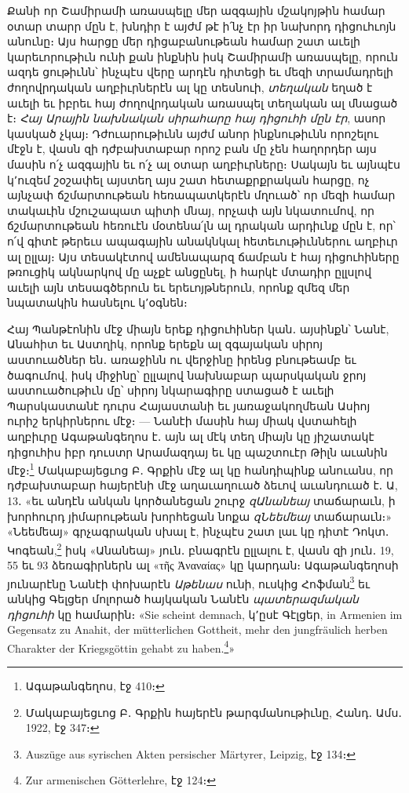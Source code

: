 \documentclass{article}
\begin{document}
{Քանի որ Շամիրամի առասպելը մեր ազգային մշակոյթին համար օտար տարր մըն է, խնդիր է այժմ թէ ի՛նչ էր իր նախորդ դիցուհւոյն անունը։ Այս հարցը մեր դիցաբանութեան համար շատ աւելի կարեւորութիւն ունի քան ինքնին իսկ Շամիրամի առասպելը, որուն ազդե ցութիւնն՝ ինչպէս վերը արդէն դիտեցի եւ մեզի տրամադրելի ժողովրդական աղբիւրներէն ալ կը տեսնուի, \emph{տեղական} եղած է աւելի եւ իբրեւ հայ ժողովրդական առասպել տեղական ալ մնացած է։ \emph{Հայ Արային նախնական սիրահարը հայ դիցուհի մըն էր}, ասոր կասկած չկայ։ Դժուարութիւնն այժմ անոր ինքնութիւնն որոշելու մէջն է, վասն զի դժբախտաբար որոշ բան մը չեն հաղորդեր այս մասին ո՛չ ազգային եւ ո՛չ ալ օտար աղբիւրները։ Սակայն եւ այնպէս կ՚ուզեմ շօշափել այստեղ այս շատ հետաքրքրական հարցը, ոչ այնչափ ճշմարտութեան հեռապատկերէն մղուած՝ որ մեզի համար տակաւին մշուշապատ պիտի մնայ, որչափ այն նկատումով, որ ճշմարտութեան հեռուէն մօտենա՛լն ալ դրական արդիւնք մըն է, որ՝ ո՛վ գիտէ թերեւս ապագային անակնկալ հետեւութիւններու աղբիւր ալ ըլլայ։ Այս տեսակէտով ամենապարզ ճամբան է հայ դիցուհիները թռուցիկ ակնարկով մը աչքէ անցընել, ի հարկէ մտադիր ըլլսլով աւելի այն տեսագծերուն եւ երեւոյթներուն, որոնք զմեզ մեր նպատակին հասնելու կ՚օգնեն։

Հայ Պանթէոնին մէջ միայն երեք դիցուհիներ կան․ այսինքն՝ Նանէ, Անահիտ եւ Աստղիկ, որոնք երեքն ալ զգայական սիրոյ աստուածներ են․ առաջինն ու վերջինը իրենց բնութեամբ եւ ծագումով, իսկ միջինը՝ ըլլալով նախնաբար պարսկական ջրոյ աստուածութիւն մը՝ սիրոյ նկարագիրը ստացած է աւելի Պարսկաստանէ դուրս Հայաստանի եւ յառաջակողմեան Ասիոյ ուրիշ երկիրներու մէջ։ — Նանէի մասին հայ միակ վստահելի աղբիւրը Ագաթանգեղոս է․ այն ալ մէկ տեղ միայն կը յիշատակէ դիցուհիս իբր դուստր Արամազդայ եւ կը պաշտուէր Թիլն աւանին մէջ։\footnote{Ագաթանգեղոս, էջ 410։} Մակաբայեցւոց Բ․ Գրքին մէջ ալ կը հանդիպինք անուանս, որ դժբախտաբար հայերէնի մէջ աղաւաղուած ձեւով աւանդուած է․ Ա, 13․ «եւ անդէն անկան կործանեցան շուրջ \emph{զԱնանեայ} տաճարաւն, ի խորհուրդ յիմարութեան խորհեցան նոքա \emph{զՆեեմեայ} տաճարաւն։» «Նեեմեայ» գրչագրական սխալ է, ինչպէս շատ լաւ կը դիտէ Դոկտ․ Կոգեան,\footnote{Մակաբայեցւոց Բ․ Գրքին հայերէն թարգմանութիւնը, Հանդ․ Ամս․ 1922, էջ 347։} իսկ «Անանեայ» յուն․ բնագրէն ըլլալու է, վասն զի յուն․ 19, 55 եւ 93 ձեռագիրներն ալ «τῆς Ἀναναίας» կը կարդան։ Ագաթանգեղոսի յունարէնը Նանէի փոխարէն \emph{Աթենաս} ունի, ուսկից Հոֆման\footnote{Auszüge aus syrischen Akten persischer Märtyrer, Leipzig, էջ 134։} եւ անկից Գելցեր մոլորած հայկական Նանէն \emph{պատերազմական դիցուհի} կը համարին։ «Sie scheint demnach, կ՚ըսէ Գէլցեր, in Armenien im Gegensatz zu Anahit, der mütterlichen Gottheit, mehr den jungfräulich herben Charakter der Kriegsgöttin gehabt zu haben.\footnote{Zur armenischen Götterlehre, էջ 124։}»

}
\end{document}

